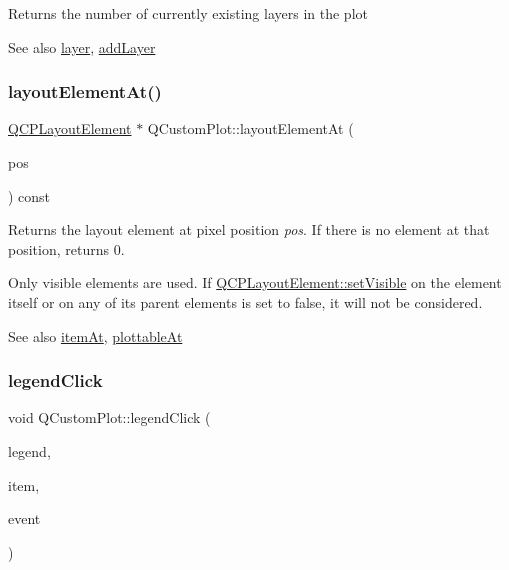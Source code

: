 Returns the number of currently existing layers in the plot

\begin{DoxySeeAlso}{See also}
\hyperlink{classQCustomPlot_a0a96244e7773b242ef23c32b7bdfb159}{layer}, \hyperlink{classQCustomPlot_ad5255393df078448bb6ac83fa5db5f52}{add\+Layer} 
\end{DoxySeeAlso}
\mbox{\label{classQCustomPlot_afaa1d304e0287d140fd238e90889ef3c}} 
\subsubsection{\texorpdfstring{layout\+Element\+At()}{layoutElementAt()}}
{\footnotesize\ttfamily \hyperlink{classQCPLayoutElement}{Q\+C\+P\+Layout\+Element} $\ast$ Q\+Custom\+Plot\+::layout\+Element\+At (\begin{DoxyParamCaption}\item[{const Q\+PointF \&}]{pos }\end{DoxyParamCaption}) const}

Returns the layout element at pixel position {\itshape pos}. If there is no element at that position, returns 0.

Only visible elements are used. If \hyperlink{classQCPLayerable_a3bed99ddc396b48ce3ebfdc0418744f8}{Q\+C\+P\+Layout\+Element\+::set\+Visible} on the element itself or on any of its parent elements is set to false, it will not be considered.

\begin{DoxySeeAlso}{See also}
\hyperlink{classQCustomPlot_ac08578e0e6c059c83a8d340ba0038e8e}{item\+At}, \hyperlink{classQCustomPlot_acddbbd8b16dd633f0d94e5a736fbd8cf}{plottable\+At} 
\end{DoxySeeAlso}
\mbox{\label{classQCustomPlot_a79cff0baafbca10a3aaf694d2d3b9ab3}} 
\subsubsection{\texorpdfstring{legend\+Click}{legendClick}}
{\footnotesize\ttfamily void Q\+Custom\+Plot\+::legend\+Click (\begin{DoxyParamCaption}\item[{\hyperlink{classQCPLegend}{Q\+C\+P\+Legend} $\ast$}]{legend,  }\item[{\hyperlink{classQCPAbstractLegendItem}{Q\+C\+P\+Abstract\+Legend\+Item} $\ast$}]{item,  }\item[{Q\+Mouse\+Event $\ast$}]{event }\end{DoxyParamCaption})\hspace{0.3cm}{\ttfamily [signal]}}

